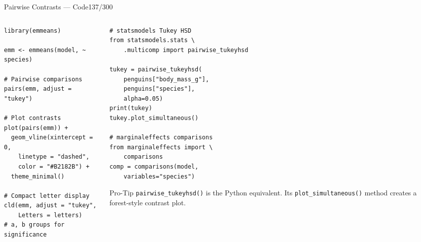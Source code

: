 \documentclass[10pt]{beamer}
\newcommand{\smark}[1]{\hfill{\scriptsize\color{codegray}#1}}
\begin{document}
\begin{frame}[fragile]{Pairwise Contrasts --- Code}\smark{137/300}
\begin{columns}[T]
\begin{column}{0.48\textwidth}
\begin{lstlisting}[style=Rstyle]
library(emmeans)

emm <- emmeans(model, ~ species)

# Pairwise comparisons
pairs(emm, adjust = "tukey")

# Plot contrasts
plot(pairs(emm)) +
  geom_vline(xintercept = 0,
    linetype = "dashed",
    color = "#B2182B") +
  theme_minimal()

# Compact letter display
cld(emm, adjust = "tukey",
    Letters = letters)
# a, b groups for significance
\end{lstlisting}
\end{column}
\begin{column}{0.48\textwidth}
\begin{lstlisting}[style=Pystyle]
# statsmodels Tukey HSD
from statsmodels.stats \
    .multicomp import pairwise_tukeyhsd

tukey = pairwise_tukeyhsd(
    penguins["body_mass_g"],
    penguins["species"],
    alpha=0.05)
print(tukey)
tukey.plot_simultaneous()

# marginaleffects comparisons
from marginaleffects import \
    comparisons
comp = comparisons(model,
    variables="species")
\end{lstlisting}
\vspace{0.1cm}
\begin{alertblock}{Pro-Tip}
    \scriptsize \texttt{pairwise\_tukeyhsd()} is the Python equivalent. Its \texttt{plot\_simultaneous()} method creates a forest-style contrast plot.
\end{alertblock}
\end{column}
\end{columns}
\end{frame}
\end{document}
